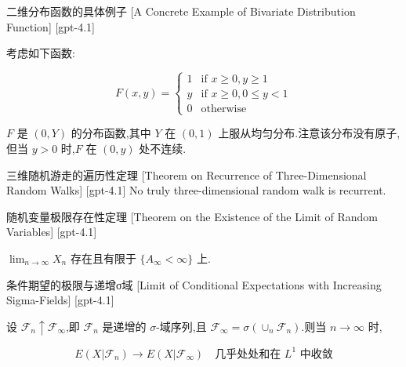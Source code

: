 \documentclass[UTF8]{ctexart}
\begin{document}
    
    
    \begin{xmp}
        {二维分布函数的具体例子}
        [A Concrete Example of Bivariate Distribution Function]
        [gpt-4.1]
        
考虑如下函数:

\[
F(x, y) =
\begin{cases}
1 & \text{if } x \geq 0, y \geq 1 \\
y & \text{if } x \geq 0, 0 \leq y < 1 \\
0 & \text{otherwise}
\end{cases}
\]

$F$ 是 $(0, Y)$ 的分布函数,其中 $Y$ 在 $(0,1)$ 上服从均匀分布.注意该分布没有原子,但当 $y > 0$ 时,$F$ 在 $(0, y)$ 处不连续.

    \end{xmp}
    
    
    
    \begin{thm}
        {三维随机游走的遍历性定理}
        [Theorem on Recurrence of Three-Dimensional Random Walks]
        [gpt-4.1]
        No truly three-dimensional random walk is recurrent.
    \end{thm}
    
    
    
    \begin{thm}
        {随机变量极限存在性定理}
        [Theorem on the Existence of the Limit of Random Variables]
        [gpt-4.1]
        
$\operatorname* { lim } _ { n \to \infty } X _ { n }$ 存在且有限于 $\{ A _ { \infty } < \infty \}$ 上.

    \end{thm}
    
    
    
    \begin{thm}
        {条件期望的极限与递增σ域}
        [Limit of Conditional Expectations with Increasing Sigma-Fields]
        [gpt-4.1]
        
设 $\mathcal{F}_{n} \uparrow \mathcal{F}_{\infty}$,即 ${\mathcal{F}}_{n}$ 是递增的 $\sigma$-域序列,且 ${\mathcal{F}}_{\infty} = \sigma\left(\cup_{n} {\mathcal{F}}_{n}\right)$.则当 $n \to \infty$ 时,

\[
E(X|\mathcal{F}_{n}) \to E(X|\mathcal{F}_{\infty}) \quad \text{几乎处处和在 } L^{1} \text{ 中收敛}
\]

    \end{thm}
    
\end{document}

